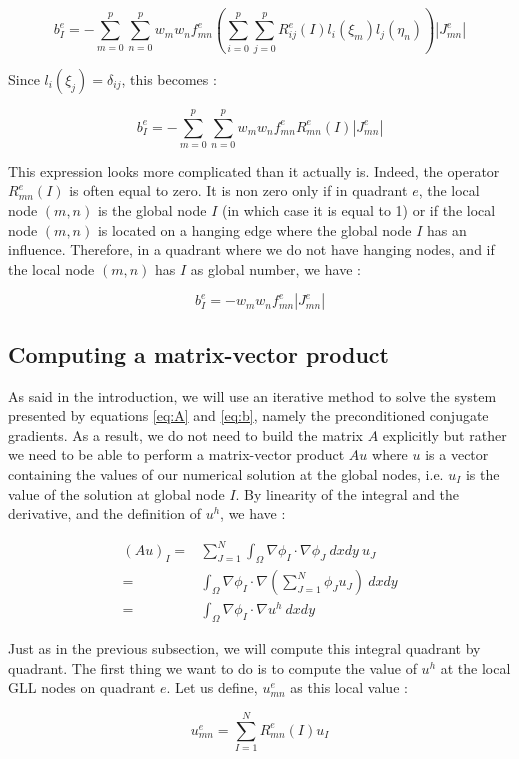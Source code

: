 $$ b_I^e = - \sum_{m=0}^p\sum_{n=0}^p w_m w_n f^e_{mn} \left( \sum_{i=0}^p\sum_{j=0}^p R^e_{ij}(I) l_i(\xi_m)l_j(\eta_n) \right) |J^e_{mn}|$$

Since $l_i(\xi_j) = \delta_{ij}$, this becomes : 

$$  b_I^e = - \sum_{m=0}^p\sum_{n=0}^p w_m w_n f^e_{mn} R^e_{mn}(I) |J^e_{mn}|$$

This expression looks more complicated than it actually is. Indeed, the operator $R_{mn}^e(I)$ is often equal to zero. It is non zero only if in quadrant $e$, the local node $(m,n)$ is the global node $I$ (in which case it is equal to 1) or if the local node $(m,n)$ is located on a hanging edge where the global node $I$ has an influence. Therefore, in a quadrant where we do not have hanging nodes, and if the local node $(m,n)$ has $I$ as global number, we have : 

$$b_I^e = - w_m w_n f^e_{mn} |J^e_{mn}|$$

\subsection{Computing a matrix-vector product}

As said in the introduction, we will use an iterative method to solve the system presented by equations \ref{eq:A} and \ref{eq:b}, namely the preconditioned conjugate gradients. As a result, we do not need to build the matrix $A$ explicitly but rather we need to be able to perform a matrix-vector product $Au$ where $u$ is a vector containing the values of our numerical solution at the global nodes, i.e. $u_I$ is the value of the solution at global node $I$. By linearity of the integral and the derivative, and the definition of $u^h$, we have : 

\begin{align*}
(Au)_I =& \sum_{J=1}^N \int_\Omega \nabla \phi_I \cdot \nabla \phi_J \:dxdy \: u_J\\
=& \int_\Omega \nabla \phi_I \cdot \nabla\left(\sum_{J=1}^N \phi_Ju_J\right)\:dxdy\\
=& \int_\Omega \nabla \phi_I \cdot \nabla u^h \: dxdy
\end{align*}

Just as in the previous subsection, we will compute this integral quadrant by quadrant. The first thing we want to do is to compute the value of $u^h$ at the local GLL nodes on quadrant $e$. Let us define, $u^e_{mn}$ as this local value : 

$$u^e_{mn} = \sum_{I=1}^N R_{mn}^e(I) u_I$$

